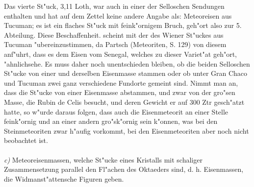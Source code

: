 \documentclass[a4paper, 11pt, oneside]{article}
\begin{document}
Das vierte St"uck, 3,11 Loth, war auch in einer der Selloschen Sendungen enthalten und hat auf dem Zettel keine andere Angabe als: Meteoreisen aus Tucuman; es ist ein flaches St"uck mit feink"ornigem Bruch, geh"ort also zur 5. Abteilung. Diese Beschaffenheit. scheint mit der des Wiener St"uckes aus Tucuman "ubereinzustimmen, da Partsch (Meteoriten, S. 129) von diesem anf"uhrt, dass es dem Eisen vom Senegal, welches zu dieser Variet"at geh"ort, "ahnlichsehe. Es muss daher noch unentschieden bleiben, ob die beiden Selloschen St"ucke von einer und derselben Eisenmasse stammen oder ob unter Gran Chaco und Tucuman zwei ganz verschiedene Fundorte gemeint sind. Nimmt man an, dass die St"ucke von einer Eisenmasse abstammen, und zwar von der gro"sen Masse, die Rubin de Celis besucht, und deren Gewicht er auf 300 Ztr gesch"atzt hatte, so w"urde daraus folgen, dass auch die Eisenmeteorit an einer Stelle feink"ornig und an einer andern gro"sk"ornig sein k"onnen, was bei den Steinmeteoriten zwar h"aufig vorkommt, bei den Eisenmeteoriten aber noch nicht beobachtet ist.
\vspace{\medskipamount}
\paragraph{}
\emph{c)} Meteoreisenmassen, welche St"ucke eines Kristalls mit schaliger Zusammensetzung parallel den Fl"achen des Oktaeders sind, d. h. Eisenmassen, die Widmanst"attensche Figuren geben.
\vspace{\medskipamount}
\end{document}
